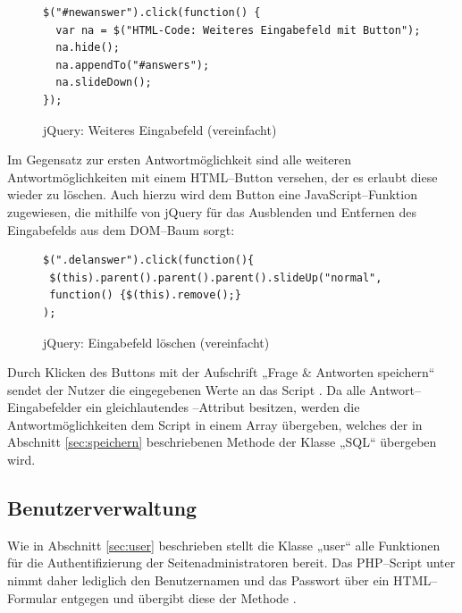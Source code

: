 \begin{figure}[H]
\begin{spacing}{1.0}
\begin{verbatim}
$("#newanswer").click(function() {
  var na = $("HTML-Code: Weiteres Eingabefeld mit Button");
  na.hide();
  na.appendTo("#answers");
  na.slideDown();	
});
\end{verbatim}
\caption{jQuery: Weiteres Eingabefeld (vereinfacht)}
\label{jquery:weitereantwort}
\end{spacing}
\end{figure}

Im Gegensatz zur ersten Antwortmöglichkeit sind alle weiteren Antwortmöglichkeiten mit einem HTML--Button versehen, der es erlaubt diese wieder zu löschen. Auch hierzu wird dem Button eine JavaScript--Funktion zugewiesen, die mithilfe von jQuery für das Ausblenden und Entfernen des Eingabefelds aus dem DOM--Baum sorgt:

\begin{figure}[H]
\begin{spacing}{1.0}
\begin{verbatim}
$(".delanswer").click(function(){
 $(this).parent().parent().parent().slideUp("normal",
 function() {$(this).remove();}
);
\end{verbatim}
\caption{jQuery: Eingabefeld löschen (vereinfacht)}
\label{jquery:antwortloeschen}
\end{spacing}
\end{figure}

Durch Klicken des Buttons mit der Aufschrift „Frage \& Antworten speichern“ sendet der Nutzer die eingegebenen Werte an das Script . Da alle Antwort--Eingabefelder ein gleichlautendes --Attribut besitzen, werden die Antwortmöglichkeiten dem Script in einem Array übergeben, welches der in Abschnitt \ref{sec:speichern} beschriebenen Methode der Klasse „SQL“ übergeben wird.

\subsection{Benutzerverwaltung}

Wie in Abschnitt \ref{sec:user} beschrieben stellt die Klasse „user“ alle Funktionen für die Authentifizierung der Seitenadministratoren bereit. Das PHP--Script unter  nimmt daher lediglich den Benutzernamen und das Passwort über ein HTML--Formular entgegen und übergibt diese der Methode .

